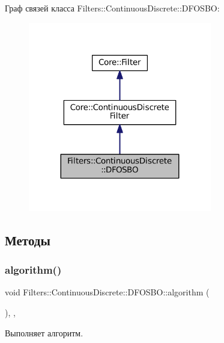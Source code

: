 Граф связей класса Filters\+:\+:Continuous\+Discrete\+:\+:D\+F\+O\+S\+BO\+:\nopagebreak
\begin{figure}[H]
\begin{center}
\leavevmode
\includegraphics[width=227pt]{class_filters_1_1_continuous_discrete_1_1_d_f_o_s_b_o__coll__graph}
\end{center}
\end{figure}


\subsection{Методы}
\hypertarget{class_filters_1_1_continuous_discrete_1_1_d_f_o_s_b_o_ab911983ab9ff8e22dc68e33fdb4601b6}{}\label{class_filters_1_1_continuous_discrete_1_1_d_f_o_s_b_o_ab911983ab9ff8e22dc68e33fdb4601b6} 
\subsubsection{\texorpdfstring{algorithm()}{algorithm()}}
{\footnotesize\ttfamily void Filters\+::\+Continuous\+Discrete\+::\+D\+F\+O\+S\+B\+O\+::algorithm (\begin{DoxyParamCaption}{ }\end{DoxyParamCaption})\hspace{0.3cm}{\ttfamily [override]}, {\ttfamily [protected]}, {\ttfamily [virtual]}}



Выполняет алгоритм. 

